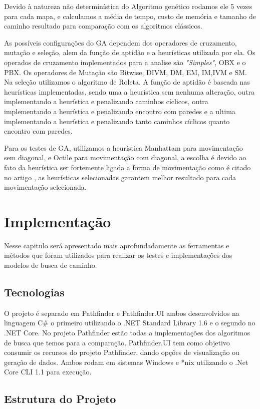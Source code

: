  Devido à natureza não determinística do Algoritmo genético rodamos ele 5 vezes para cada mapa, e calculamos a média de tempo, custo de memória e tamanho de caminho resultado para comparação com os algoritmos clássicos.
 
  As possíveis configurações do GA dependem dos operadores de cruzamento, mutação e seleção, alem da função de aptidão e a heurísticas utilizada por ela. Os operados de cruzamento implementados para a analise são \textit{"Simples"}, OBX e o PBX. Os operadores de Mutação são Bitwise, DIVM, DM, EM, IM,IVM e SM. Na seleção utilizamos o algoritmo de Roleta. A função de aptidão é baseada nas heurísticas implementadas, sendo uma a heurística sem nenhuma alteração, outra implementando a heurística e penalizando caminhos cíclicos, outra implementando a heurística e penalizando encontro com paredes e a ultima implementando a heurística e penalizando tanto caminhos cíclicos quanto encontro com paredes.
 
 Para os testes de GA, utilizamos a heurística Manhattam para movimentação sem diagonal, e Octile para movimentação com diagonal, a escolha é devido ao fato da heurística ser fortemente ligada a forma de movimentação como é citado no artigo \cite{GameProgrammingHeuristics}, as heurísticas selecionadas garantem melhor resultado para cada movimentação selecionada.
 
 \chapter[Implementação]{Implementação}
 
 Nesse capitulo será apresentado mais aprofundadamente as ferramentas e métodos que foram utilizados para realizar os testes  e implementações dos modelos de busca de caminho.
 
 \section{Tecnologias}
 O projeto é separado em Pathfinder e Pathfinder.UI ambos desenvolvidos na linguagem C\# o primeiro utilizando o .NET Standard Library 1.6 e o segundo no .NET Core. No projeto Pathfinder estão todas a  implementações dos algoritmos de busca que temos para a comparação. Pathfinder.UI tem como objetivo consumir os recursos do projeto Pathfinder, dando opções de visualização ou geração de dados. Ambos rodam em sistemas Windows e \**nix utilizando o .Net Core CLI 1.1 para execução.
 
 \section{Estrutura do Projeto}
 
